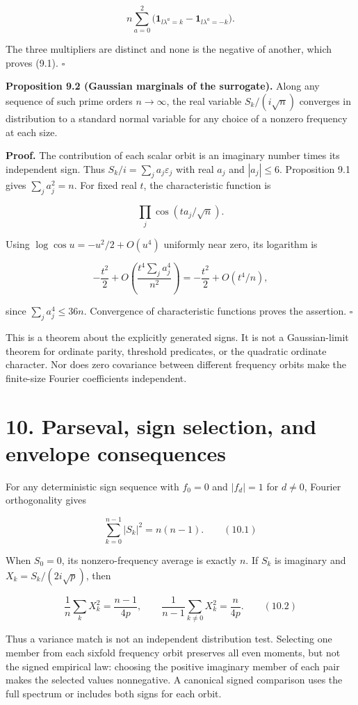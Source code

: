 \documentclass[
  11pt,
  a4paper,
]{article}
\begin{document}
\[
n\sum_{a=0}^2\bigl(\mathbf1_{l\lambda^a=k}-\mathbf1_{l\lambda^a=-k}\bigr).
\]

The three multipliers are distinct and none is the negative of another,
which proves (9.1). \(\square\)

\textbf{Proposition 9.2 (Gaussian marginals of the surrogate).} Along
any sequence of such prime orders \(n\to\infty\), the real variable
\(S_k/(i\sqrt n)\) converges in distribution to a standard normal
variable for any choice of a nonzero frequency at each size.

\textbf{Proof.} The contribution of each scalar orbit is an imaginary
number times its independent sign. Thus
\(S_k/i=\sum_j a_j\varepsilon_j\) with real \(a_j\) and \(|a_j|\leq6\).
Proposition 9.1 gives \(\sum_j a_j^2=n\). For fixed real \(t\), the
characteristic function is

\[
\prod_j\cos(t a_j/\sqrt n).
\]

Using \(\log\cos u=-u^2/2+O(u^4)\) uniformly near zero, its logarithm is

\[
-\frac{t^2}{2}+O\!\left(\frac{t^4\sum_j a_j^4}{n^2}\right)
=-\frac{t^2}{2}+O(t^4/n),
\]

since \(\sum_j a_j^4\leq36n\). Convergence of characteristic functions
proves the assertion. \(\square\)

This is a theorem about the explicitly generated signs. It is not a
Gaussian-limit theorem for ordinate parity, threshold predicates, or the
quadratic ordinate character. Nor does zero covariance between different
frequency orbits make the finite-size Fourier coefficients independent.

\section{10. Parseval, sign selection, and envelope
consequences}\label{parseval-sign-selection-and-envelope-consequences}

For any deterministic sign sequence with \(f_0=0\) and \(|f_d|=1\) for
\(d\neq0\), Fourier orthogonality gives

\[
\sum_{k=0}^{n-1}|S_k|^2=n(n-1). \qquad (10.1)
\]

When \(S_0=0\), its nonzero-frequency average is exactly \(n\). If
\(S_k\) is imaginary and \(X_k=S_k/(2i\sqrt p)\), then

\[
\frac1n\sum_k X_k^2=\frac{n-1}{4p},\qquad
\frac1{n-1}\sum_{k\neq0}X_k^2=\frac{n}{4p}. \qquad (10.2)
\]

Thus a variance match is not an independent distribution test. Selecting
one member from each sixfold frequency orbit preserves all even moments,
but not the signed empirical law: choosing the positive imaginary member
of each pair makes the selected values nonnegative. A canonical signed
comparison uses the full spectrum or includes both signs for each orbit.
\end{document}

